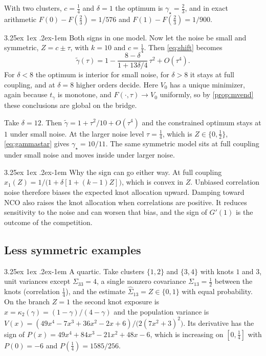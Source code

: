 \documentclass[11pt]{article}
\makeatletter
\renewcommand\paragraph{\@startsection{paragraph}{4}{\z@}%
  {3.25ex \@plus1ex \@minus.2ex}{-1em}%
  {\normalfont\normalsize\itshape}}
\makeatother
\begin{document}
With two clusters, $c=\tfrac14$ and $\delta=1$ the optimum is
$\gamma_\star=\tfrac23$, and in exact arithmetic $F(0)-F(\tfrac23)=1/576$
and $F(1)-F(\tfrac23)=1/900$.

\paragraph{Both signs in one model.} Now let the noise be small and
symmetric, $Z=c\pm\tau$, with $k=10$ and $c=\tfrac14$. Then \eqref{eq:shift}
becomes
\begin{equation}
  \tilde\gamma(\tau)=1-\frac{8-\delta}{1+13\delta/4}\,\tau^2+O(\tau^4).
  \label{eq:threshold}
\end{equation}
For $\delta<8$ the optimum is interior for small noise, for $\delta>8$ it
stays at full coupling, and at $\delta=8$ higher orders decide. Here $V_0$
has a unique minimizer, again because $t_\gamma$ is monotone, and
$F(\cdot,\tau)\to V_0$ uniformly, so by \cref{prop:mvend} these conclusions
are global on the bridge.

Take $\delta=12$. Then $\tilde\gamma=1+\tau^2/10+O(\tau^4)$ and the
constrained optimum stays at $1$ under small noise. At the larger noise
level $\tau=\tfrac14$, which is $Z\in\{0,\tfrac12\}$, \eqref{eq:gammastar}
gives $\gamma_\star=10/11$. The same symmetric model sits at full coupling
under small noise and moves inside under larger noise.

\paragraph{Why the sign can go either way.} At full coupling
$x_1(Z)=1/\big(1+\delta[1+(k-1)Z]\big)$, which is convex in $Z$. Unbiased
correlation noise therefore biases the expected knot allocation upward.
Damping toward NCO also raises the knot allocation when correlations are
positive. It reduces sensitivity to the noise and can worsen that bias, and
the sign of $G'(1)$ is the outcome of the competition.

\subsection{Less symmetric examples}

\paragraph{A quartic.} Take clusters $\{1,2\}$ and $\{3,4\}$ with knots $1$
and $3$, unit variances except $\Sigma_{33}=4$, a single nonzero covariance
$\Sigma_{13}=\tfrac12$ between the knots (correlation $\tfrac14$), and the
estimate
$\widehat\Sigma_{13}=Z\in\{0,1\}$ with equal probability. On the branch
$Z=1$ the second knot exposure is $x=\kappa_2(\gamma)=(1-\gamma)/(4-\gamma)$
and the population variance is
$V(x)=(49x^4-7x^3+36x^2-2x+6)/\big(2(7x^2+3)^2\big)$. Its derivative has the
sign of $P(x)=49x^4+84x^3-21x^2+48x-6$, which is increasing on
$[0,\tfrac14]$ with $P(0)=-6$ and $P(\tfrac14)=1585/256$.
\end{document}
